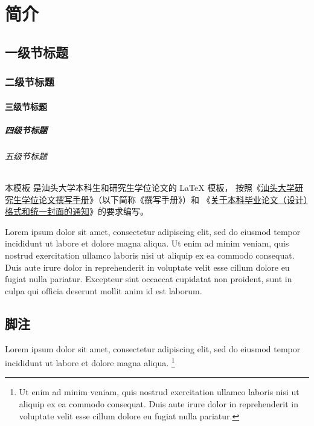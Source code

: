 
\chapter{简介}

\section{一级节标题}

\subsection{二级节标题}

\subsubsection{三级节标题}

\paragraph{四级节标题}

\subparagraph{五级节标题}

本模板  是汕头大学本科生和研究生学位论文的 \LaTeX{}
模板， 按照《\href{http://gradschool.stu.edu.cn/static/oldsite/ylb/material/xw/wdxz/32.pdf}
{汕头大学研究生学位论文撰写手册}》（以下简称《撰写手册》）和
《\href{https://www.teach.stu.edu.cn/notice/notice-teaching/11530.html}
{关于本科毕业论文（设计）格式和统一封面的通知}》的要求编写。

Lorem ipsum dolor sit amet, consectetur adipiscing elit, sed do eiusmod tempor
incididunt ut labore et dolore magna aliqua.
Ut enim ad minim veniam, quis nostrud exercitation ullamco laboris nisi ut
aliquip ex ea commodo consequat.
Duis aute irure dolor in reprehenderit in voluptate velit esse cillum dolore eu
fugiat nulla pariatur.
Excepteur sint occaecat cupidatat non proident, sunt in culpa qui officia
deserunt mollit anim id est laborum.



\section{脚注}

Lorem ipsum dolor sit amet, consectetur adipiscing elit, sed do eiusmod tempor
incididunt ut labore et dolore magna aliqua.
\footnote{Ut enim ad minim veniam, quis nostrud exercitation ullamco laboris
  nisi ut aliquip ex ea commodo consequat.
  Duis aute irure dolor in reprehenderit in voluptate velit esse cillum dolore
  eu fugiat nulla pariatur.}
